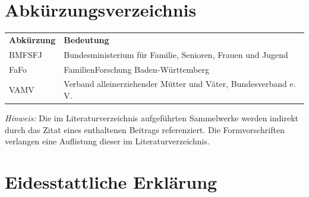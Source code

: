 \documentclass[a4paper,oneside,fontsize=11pt,headsepline,parskip=off,open=any,headings=small,listof=totoc,bibliography=totoc]{scrbook}
\begin{document}
\chapter*{Abkürzungsverzeichnis}

\begin{tabular}{ll}
  \textbf{Abkürzung} & \textbf{Bedeutung}\\
  BMFSFJ & Bundesministerium für Familie, Senioren, Frauen und Jugend\\
  FaFo & FamilienForschung Baden-Württemberg\\
  VAMV & Verband alleinerziehender Mütter und Väter, Bundesverband e.\,V.\\
\end{tabular}


\listoffigures


\cleardoublepage
{
  \RaggedRight
  \printbibliography
}

\noindent%
\emph{Hinweis:} %
Die im Literaturverzeichnis aufgeführten Sammelwerke werden indirekt
durch das Zitat eines enthaltenen Beitrags referenziert. Die
Formvorschriften verlangen eine Auflistung dieser im
Literaturverzeichnis.






\cleardoublepage
\pagestyle{empty}
\chapter*{Eidesstattliche Erklärung}
\end{document}
